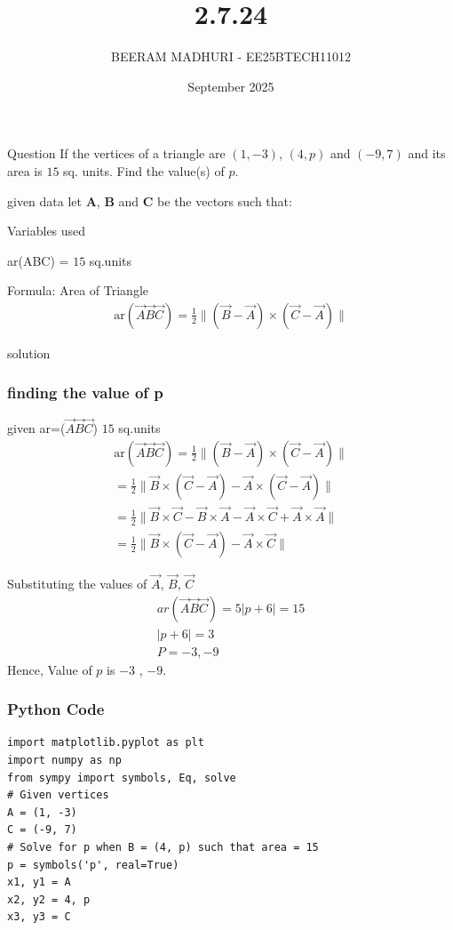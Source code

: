 \documentclass{beamer}
\title %
{2.7.24}
\date{September  2025}
\author %
{BEERAM MADHURI - EE25BTECH11012}
\begin{document}
\frame{\titlepage}
\begin{frame}{Question}
 If the vertices of a triangle are $(1,-3)$, $(4, p)$ and $(-9, 7)$ and its area is $15$ sq. units. Find the value(s) of $p$.
\end{frame}
 
\begin{frame}{given data}
let $\mathbf{A}$, $\mathbf{B}$ and $\mathbf{C}$ be the vectors such that:
\begin{table}[h!]
    \centering
    
    \caption{Variables used}
    \label{table 2.7.24}
\end{table}
{ar}(ABC) = $15$ sq.units
\end{frame}

\begin{frame}{Formula: Area of Triangle}
\begin{align*}
 \text{ar}(\Vec{A}\Vec{B}\Vec{C}) = \frac{1}{2} \| (\vec{B}-\vec{A}) \times (\vec{C}-\vec{A}) \| 
 \end{align*}
 \end{frame}
 

\begin{frame}{solution}
    \frametitle{finding the value of p}
given {ar=}($\Vec{A}$$\Vec{B}$$\Vec{C}$)  $15$ sq.units
\begin{align}
\text {ar}(\Vec{A}\Vec{B}\Vec{C}) = \frac{1}{2} \| (\vec{B}-\vec{A}) \times (\vec{C}-\vec{A}) \| \\
= \frac{1}{2} \| \vec{B} \times (\vec{C}-\vec{A}) - \vec{A} \times (\vec{C}-\vec{A}) \|\\
= \frac{1}{2} \|\vec{B} \times \vec{C} - \vec{B} \times \vec{A} - \vec{A} \times \vec{C} + \vec{A} \times \vec{A} \|\\
= \frac{1}{2} \| \vec{B} \times (\vec{C}-\vec{A}) - \vec{A} \times \vec{C} \|
\end{align}
\end{frame}
\begin{frame}
Substituting the values of $\Vec{A}$,  $\Vec{B}$,  $\Vec{C}$
\begin{align}
{ar} (\Vec{A}\Vec{B}\Vec{C})= 5|p+6| = 15\\
|p+6| = 3\\
P=-3 , -9
\end{align}
Hence, Value of $p$ is $-3$ , $-9$.
\end{frame}


\begin{frame}[fragile]
    \frametitle{Python Code}
    \begin{lstlisting}
import matplotlib.pyplot as plt
import numpy as np
from sympy import symbols, Eq, solve
# Given vertices
A = (1, -3)
C = (-9, 7)
# Solve for p when B = (4, p) such that area = 15
p = symbols('p', real=True)
x1, y1 = A
x2, y2 = 4, p
x3, y3 = C

\end{lstlisting}
\end{frame}
\end{document}
